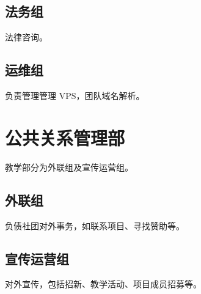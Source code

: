    \subsection{法务组}
    法律咨询。


    \subsection{运维组}
    负责管理管理 VPS，团队域名解析。




\section{公共关系管理部}
    教学部分为外联组及宣传运营组。
    \subsection{外联组}
    负债社团对外事务，如联系项目、寻找赞助等。


    \subsection{宣传运营组}
    对外宣传，包括招新、教学活动、项目成员招募等。
